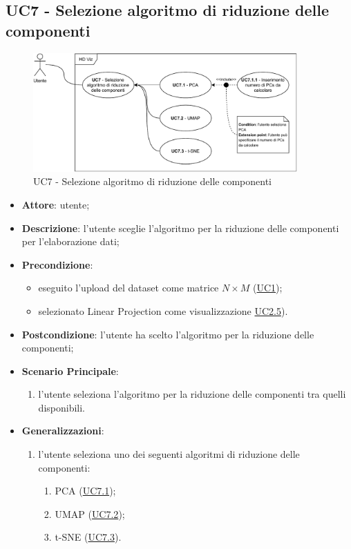 \subsection{UC7 - Selezione algoritmo di riduzione delle componenti}
    \label{uc7}
    
    \begin{figure}[htbp]
        \centering
        \includegraphics[width=0.9\textwidth]{source/sections/casi-uso/diagrams/uc7.pdf}
        \caption{UC7 - Selezione algoritmo di riduzione delle componenti}
        \label{fig:uc7}
    \end{figure}
    
    \begin{itemize}
    \item \textbf{Attore}: utente;
    \item \textbf{Descrizione}: l'utente sceglie l'algoritmo per la riduzione delle componenti per l'elaborazione dati;
    \item \textbf{Precondizione}: 
    \begin{itemize}
        \item eseguito l'upload del dataset come matrice $N\times M$ (\hyperref[uc1]{UC1});
        \item selezionato Linear Projection come visualizzazione \hyperref[uc2.5]{UC2.5}).
    \end{itemize}  
    \item \textbf{Postcondizione}: l'utente ha scelto l'algoritmo per la riduzione delle componenti;
    \item \textbf{Scenario Principale}: 
    \begin{enumerate}
        \item l'utente seleziona l'algoritmo per la riduzione delle componenti tra quelli disponibili.
    \end{enumerate}
    \item \textbf{Generalizzazioni}:
        \begin{enumerate}
            \item l'utente seleziona uno dei seguenti algoritmi di riduzione delle componenti:
                \begin{enumerate}
                    \item PCA (\hyperref[uc7.1]{UC7.1});
                    \item UMAP (\hyperref[uc7.2]{UC7.2});
                    \item t-SNE (\hyperref[uc7.3]{UC7.3}).
                \end{enumerate}
        \end{enumerate}  
    \end{itemize}
    
